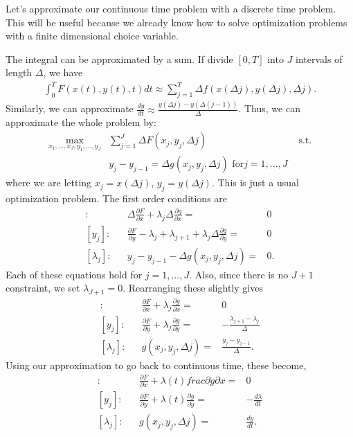 Let's approximate our continuous time problem with a discrete time
problem. This will be useful because we already know how to solve
optimization problems with a finite dimensional choice variable. 

The integral can be approximated by a sum. If divide $[0,T]$ into $J$
intervals of length $\Delta$, we have
\begin{align*}
  \int_0^T F(x(t),y(t),t) dt \approx \sum_{j=1}^T \Delta f(x(\Delta
  j), y(\Delta j) , \Delta j).
\end{align*}
Similarly, we can approximate $\frac{dy}{dt} \approx \frac{y(\Delta j)
  - y(\Delta(j-1))}{\Delta}$. 
Thus, we can approximate the whole problem by:
\begin{align*}
  \max_{x_1, ..., x_J, y_1, ..., y_J} & \sum_{j=1}^J \Delta F(x_j,
  y_j,\Delta j) 
  & \text{ s.t.} \\
  & y_j - y_{j-1} = \Delta g(x_j,y_j,\Delta j) \text{ for} j = 1,...,J
\end{align*}
where we are letting $x_j = x(\Delta j)$, $y_j = y(\Delta j)$. This is
just a usual optimization problem. The first order conditions are
\begin{align*}
  [x_j]: &&  \Delta \frac{\partial F}{\partial x} + \lambda_j \Delta
  \frac{\partial g}{\partial x} = & 0 \\
  [y_j]: &&  \frac{\partial F}{\partial y} - \lambda_j + \lambda_{j+1}
  + \lambda_j \Delta
  \frac{\partial g}{\partial y} = & 0 \\
  [\lambda_j]: && y_j - y_{j-1} - \Delta g(x_j,y_j,\Delta j) = & 0 .
\end{align*}
Each of these equations hold for $j = 1,..., J$. Also, since there is
no $J+1$ constraint, we set $\lambda_{J+1}=0$. Rearranging these
slightly gives
\begin{align*}
  [x_j]: &&  \frac{\partial F}{\partial x} + \lambda_j \frac{\partial
    g}{\partial x} = & 0 \\ 
  [y_j]: &&  \frac{\partial F}{\partial y} + \lambda_j 
  \frac{\partial g}{\partial y} = & -\frac{\lambda_{j+1} -
    \lambda_j}{\Delta} \\
  [\lambda_j]: && g(x_j,y_j,\Delta j) = & \frac{y_j - y_{j-1}}{\Delta}.
\end{align*}
Using our approximation to go back to continuous time, these become,
\begin{align*}
  [x_j]: &&  \frac{\partial F}{\partial x} + \lambda(t) frac{\partial
    g}{\partial x} = & 0 \\ 
  [y_j]: &&  \frac{\partial F}{\partial y} + \lambda(t)
  \frac{\partial g}{\partial y} = & -\frac{d\lambda}{dt} \\ 
  [\lambda_j]: && g(x_j,y_j,\Delta j) = & \frac{dy}{dt}. 
\end{align*}
